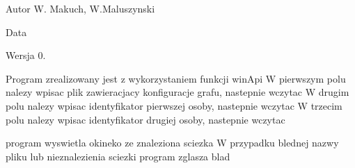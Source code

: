\begin{DoxyAuthor}{Autor}
W. Makuch, W.\+Maluszynski 
\end{DoxyAuthor}
\begin{DoxyDate}{Data}

\end{DoxyDate}
\begin{DoxyVersion}{Wersja}
0.
\end{DoxyVersion}
Program zrealizowany jest z wykorzystaniem funkcji win\+Api W pierwszym polu nalezy wpisac plik zawieracjacy konfiguracje grafu, nastepnie wczytac W drugim polu nalezy wpisac identyfikator pierwszej osoby, nastepnie wczytac W trzecim polu nalezy wpisac identyfikator drugiej osoby, nastepnie wczytac

program wyswietla okineko ze znaleziona sciezka W przypadku blednej nazwy pliku lub nieznalezienia sciezki program zglasza blad 